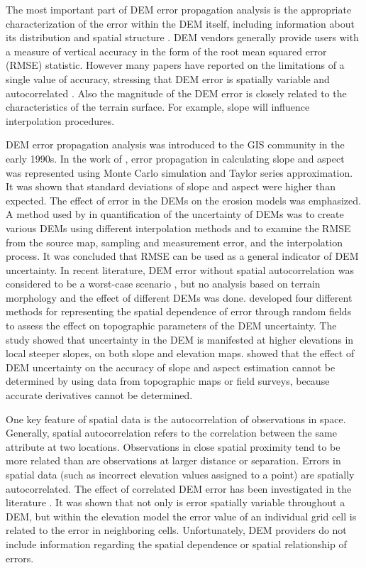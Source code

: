 \documentclass[12pt]{article}
\begin{document}
The most important part of DEM error propagation analysis is the
appropriate characterization of the error within the DEM itself,
including information about its distribution and spatial structure
\citep{Shortridge2001}.  DEM vendors generally provide users with a
measure of vertical accuracy in the form of the root mean squared
error (RMSE) statistic. However many papers have reported on the
limitations of a single value of accuracy, stressing that DEM error is
spatially variable and autocorrelated \citep{Wechsler2006,
  Amii_Darnell}. Also the magnitude of the DEM error is closely
related to the characteristics of the terrain surface. For example,
slope will influence interpolation procedures.


DEM error propagation analysis was introduced to the GIS community in
the early 1990s.  In the work of \citet{Heuvelink1990}, error
propagation in calculating slope and aspect was represented using
Monte Carlo simulation and Taylor series approximation. It was shown
that standard deviations of slope and aspect were higher than
expected.  The effect of error in the DEMs on the erosion models was
emphasized.  A method used by \citet{Qihao_Weng} in quantification of
the uncertainty of DEMs was to create various DEMs using different
interpolation methods and to examine the RMSE from the source map,
sampling and measurement error, and the interpolation process. It was
concluded that RMSE can be used as a general indicator of DEM
uncertainty.  In recent literature, DEM error without spatial
autocorrelation was considered to be a worst-case scenario
\citep{Heuvelink1989, VanNiel2004, Oksanen2006}, but no analysis based
on terrain morphology and the effect of different DEMs was done.
\citet{Wechsler2006} developed four different methods for representing
the spatial dependence of error through random fields to assess the
effect on topographic parameters of the DEM uncertainty. The study
showed that uncertainty in the DEM is manifested at higher elevations
in local steeper slopes, on both slope and elevation maps.
\citet{Florinsky1998} showed that the effect of DEM uncertainty on the
accuracy of slope and aspect estimation cannot be determined by using
data from topographic maps or field surveys, because accurate
derivatives cannot be determined.

One key feature of spatial data is the autocorrelation of observations
in space.  Generally, spatial autocorrelation refers to the
correlation between the same attribute at two locations. Observations
in close spatial proximity tend to be more related than are
observations at larger distance or separation. Errors in spatial data
(such as incorrect elevation values assigned to a point) are spatially
autocorrelated. The effect of correlated DEM error has been
investigated in the literature \citep{Fisher_1991, Goodchild_1992}. It
was shown that not only is error spatially variable throughout a DEM,
but within the elevation model the error value of an individual grid
cell is related to the error in neighboring cells. Unfortunately, DEM
providers do not include information regarding the spatial dependence
or spatial relationship of errors.
\end{document}
